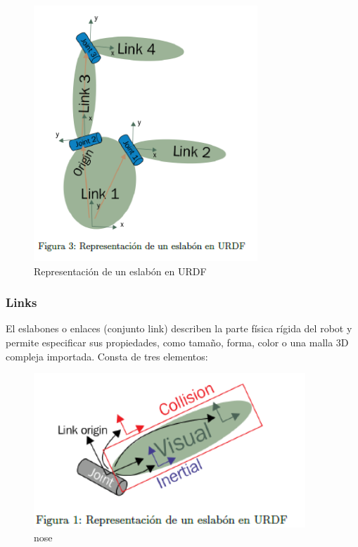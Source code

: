         \begin{figure}[htb]
            \centering
            \includegraphics[width=1.0\linewidth]{Main/Chapter3/Images3/3-7/representacion-de-eslabon-en-urdf.png}
            \caption{Representación de un eslabón en URDF}
            \label{f:Cap3-7_eslabon_urdf}
        \end{figure} 
        
        \subsubsection{Links}
        
        El eslabones o enlaces (conjunto link) describen la parte física rígida del robot y permite especificar sus propiedades, como tamaño, forma, color o una malla 3D compleja importada. Consta de tres elementos:
    
        \begin{figure}[htb]
            \centering
            \includegraphics[width=1.0\linewidth]{Main/Chapter3/Images3/3-7/eslabon2.png}
            \caption{nose}
            \label{f:Cap3-7_noseee_urdf}
        \end{figure} 

